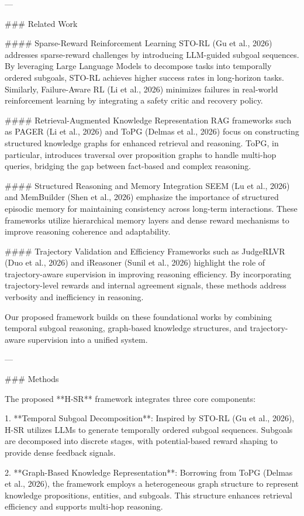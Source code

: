 ---

### Related Work  

#### Sparse-Reward Reinforcement Learning  
STO-RL (Gu et al., 2026) addresses sparse-reward challenges by introducing LLM-guided subgoal sequences. By leveraging Large Language Models to decompose tasks into temporally ordered subgoals, STO-RL achieves higher success rates in long-horizon tasks. Similarly, Failure-Aware RL (Li et al., 2026) minimizes failures in real-world reinforcement learning by integrating a safety critic and recovery policy.

#### Retrieval-Augmented Knowledge Representation  
RAG frameworks such as PAGER (Li et al., 2026) and ToPG (Delmas et al., 2026) focus on constructing structured knowledge graphs for enhanced retrieval and reasoning. ToPG, in particular, introduces traversal over proposition graphs to handle multi-hop queries, bridging the gap between fact-based and complex reasoning.

#### Structured Reasoning and Memory Integration  
SEEM (Lu et al., 2026) and MemBuilder (Shen et al., 2026) emphasize the importance of structured episodic memory for maintaining consistency across long-term interactions. These frameworks utilize hierarchical memory layers and dense reward mechanisms to improve reasoning coherence and adaptability.

#### Trajectory Validation and Efficiency  
Frameworks such as JudgeRLVR (Duo et al., 2026) and iReasoner (Sunil et al., 2026) highlight the role of trajectory-aware supervision in improving reasoning efficiency. By incorporating trajectory-level rewards and internal agreement signals, these methods address verbosity and inefficiency in reasoning.

Our proposed framework builds on these foundational works by combining temporal subgoal reasoning, graph-based knowledge structures, and trajectory-aware supervision into a unified system.

---

### Methods  

The proposed **H-SR** framework integrates three core components:  

1. **Temporal Subgoal Decomposition**:  
   Inspired by STO-RL (Gu et al., 2026), H-SR utilizes LLMs to generate temporally ordered subgoal sequences. Subgoals are decomposed into discrete stages, with potential-based reward shaping to provide dense feedback signals.  

2. **Graph-Based Knowledge Representation**:  
   Borrowing from ToPG (Delmas et al., 2026), the framework employs a heterogeneous graph structure to represent knowledge propositions, entities, and subgoals. This structure enhances retrieval efficiency and supports multi-hop reasoning.  

